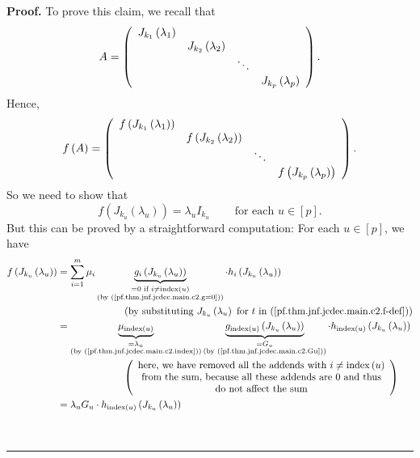 \documentclass[numbers=enddot,12pt,final,onecolumn,notitlepage]{scrartcl}%
\numberwithin{exer}{subsection}
\theoremstyle{definition}
\newenvironment{proof}[1][Proof]{\noindent\textbf{#1.} }{\ \rule{0.5em}{0.5em}}
\let\sumnonlimits\sum
\renewcommand{\sum}{\sumnonlimits\limits}
\newenvironment{noncompile}{}{}
\begin{document}
\begin{proof}
\begin{noncompile}
To prove this claim, we recall that%
\[
A=\left(
\begin{array}
[c]{cccc}%
J_{k_{1}}\left(  \lambda_{1}\right)  &  &  & \\
& J_{k_{2}}\left(  \lambda_{2}\right)  &  & \\
&  & \ddots & \\
&  &  & J_{k_{p}}\left(  \lambda_{p}\right)
\end{array}
\right)  .
\]
Hence,%
\[
f\left(  A\right)  =\left(
\begin{array}
[c]{cccc}%
f\left(  J_{k_{1}}\left(  \lambda_{1}\right)  \right)  &  &  & \\
& f\left(  J_{k_{2}}\left(  \lambda_{2}\right)  \right)  &  & \\
&  & \ddots & \\
&  &  & f\left(  J_{k_{p}}\left(  \lambda_{p}\right)  \right)
\end{array}
\right)  .
\]
So we need to show that%
\[
f\left(  J_{k_{u}}\left(  \lambda_{u}\right)  \right)  =\lambda_{u}I_{k_{u}%
}\ \ \ \ \ \ \ \ \ \ \text{for each }u\in\left[  p\right]  .
\]
But this can be proved by a straightforward computation: For each $u\in\left[
p\right]  $, we have%
\begin{align*}
f\left(  J_{k_{u}}\left(  \lambda_{u}\right)  \right)   &  =\sum_{i=1}^{m}%
\mu_{i}\underbrace{g_{i}\left(  J_{k_{u}}\left(  \lambda_{u}\right)  \right)
}_{\substack{=0\text{ if }i\neq\operatorname*{index}\left(  u\right)
\\\text{(by (\ref{pf.thm.jnf.jcdec.main.c2.g=0}))}}}\cdot h_{i}\left(
J_{k_{u}}\left(  \lambda_{u}\right)  \right) \\
&  \ \ \ \ \ \ \ \ \ \ \ \ \ \ \ \ \ \ \ \ \left(  \text{by substituting
}J_{k_{u}}\left(  \lambda_{u}\right)  \text{ for }t\text{ in
(\ref{pf.thm.jnf.jcdec.main.c2.f-def})}\right) \\
&  =\underbrace{\mu_{\operatorname*{index}\left(  u\right)  }}%
_{\substack{=\lambda_{u}\\\text{(by (\ref{pf.thm.jnf.jcdec.main.c2.index}))}%
}}\underbrace{g_{\operatorname*{index}\left(  u\right)  }\left(  J_{k_{u}%
}\left(  \lambda_{u}\right)  \right)  }_{\substack{=G_{u}\\\text{(by
(\ref{pf.thm.jnf.jcdec.main.c2.Gu}))}}}\cdot h_{\operatorname*{index}\left(
u\right)  }\left(  J_{k_{u}}\left(  \lambda_{u}\right)  \right) \\
&  \ \ \ \ \ \ \ \ \ \ \ \ \ \ \ \ \ \ \ \ \left(
\begin{array}
[c]{c}%
\text{here, we have removed all the addends with }i\neq\operatorname*{index}%
\left(  u\right) \\
\text{from the sum, because all these addends are }0\text{ and thus}\\
\text{do not affect the sum}%
\end{array}
\right) \\
&  =\lambda_{u}G_{u}\cdot h_{\operatorname*{index}\left(  u\right)  }\left(
J_{k_{u}}\left(  \lambda_{u}\right)  \right)
\end{align*}



\end{noncompile}
\end{proof}
\end{document}
